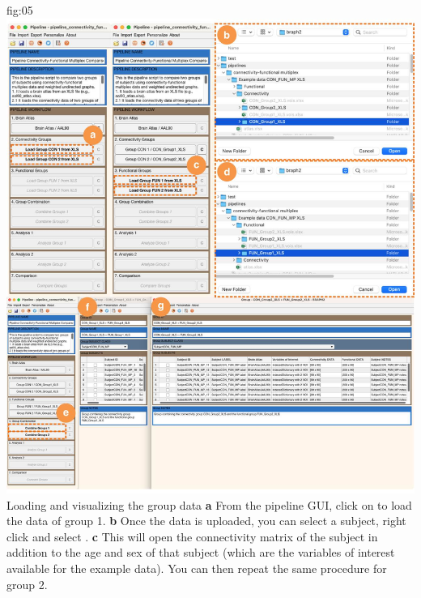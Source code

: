 \documentclass[justified]{tufte-handout}
\begin{document}
	{fig:05}
	{
	\includegraphics{fig05.jpg}
	}
	{Loading and visualizing the group data}
	{
	{\bf a} From the pipeline GUI, click on  to load the data of group 1.
	{\bf b} Once the data is uploaded, you can select a subject, right click and select .
	{\bf c} This will open the connectivity matrix of the subject in addition to the age and sex of that subject (which are the variables of interest available for the example data).
	You can then repeat the same procedure for group 2.
	}
\end{document}
